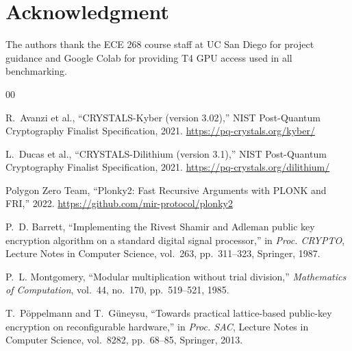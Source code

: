 \documentclass[conference]{IEEEtran}
\begin{document}
\section*{Acknowledgment}

The authors thank the ECE 268 course staff at UC San Diego for project guidance
and Google Colab for providing T4 GPU access used in all benchmarking.

\begin{thebibliography}{00}

R.~Avanzi et al., ``CRYSTALS-Kyber (version 3.02),''
NIST Post-Quantum Cryptography Finalist Specification, 2021.
\url{https://pq-crystals.org/kyber/}

L.~Ducas et al., ``CRYSTALS-Dilithium (version 3.1),''
NIST Post-Quantum Cryptography Finalist Specification, 2021.
\url{https://pq-crystals.org/dilithium/}

Polygon Zero Team, ``Plonky2: Fast Recursive Arguments with PLONK and FRI,''
2022. \url{https://github.com/mir-protocol/plonky2}

P.~D. Barrett, ``Implementing the Rivest Shamir and Adleman public key
encryption algorithm on a standard digital signal processor,''
in \textit{Proc. CRYPTO}, Lecture Notes in Computer Science, vol.~263,
pp.~311--323, Springer, 1987.

P.~L. Montgomery, ``Modular multiplication without trial division,''
\textit{Mathematics of Computation}, vol.~44, no.~170, pp.~519--521, 1985.

T.~P\"{o}ppelmann and T.~G\"{u}neysu, ``Towards practical lattice-based
public-key encryption on reconfigurable hardware,''
in \textit{Proc. SAC}, Lecture Notes in Computer Science, vol.~8282,
pp.~68--85, Springer, 2013.

\end{thebibliography}
\end{document}
